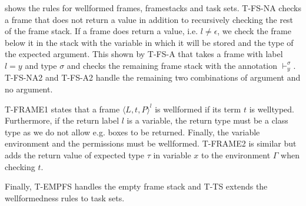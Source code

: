  shows the rules for wellformed frames, framestacks and task sets. 
T-FS-NA checks a frame that does not return a value in addition to recursively checking the rest of the frame stack. If a frame does return a value, i.e. $l \neq \epsilon$, we check the frame below it in the stack with the variable in which it will be stored and the type of the expected argument. This shown by T-FS-A that takes a frame with label $l = y$ and type $\sigma$ and checks the remaining frame stack with the annotation $\vdash_y^\sigma$. T-FS-NA2 and T-FS-A2 handle the remaining two combinations of argument and no argument.

T-FRAME1 states that a frame $\langle L, t, P \rangle^l$ is wellformed if its term $t$  is welltyped. Furthermore, if the return label $l$ is a variable, the return type must be a class type as we do not allow e.g. boxes to be returned. Finally, the variable environment and the permissions must be wellformed. T-FRAME2 is similar but adds the return value of expected type $\tau$ in variable $x$ to the environment $\Gamma$ when checking $t$.

Finally, T-EMPFS handles the empty frame stack and T-TS extends the wellformedness rules to task sets.
